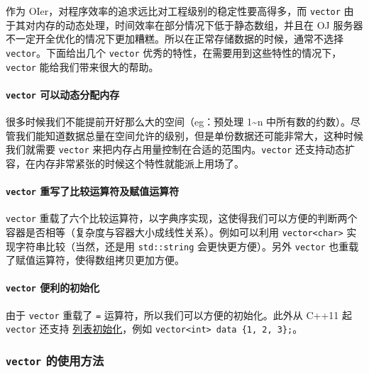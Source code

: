 作为 OIer，对程序效率的追求远比对工程级别的稳定性要高得多，而 \texttt{vector} 由于其对内存的动态处理，时间效率在部分情况下低于静态数组，并且在 OJ 服务器不一定开全优化的情况下更加糟糕。所以在正常存储数据的时候，通常不选择 \texttt{vector}。下面给出几个 \texttt{vector} 优秀的特性，在需要用到这些特性的情况下，\texttt{vector} 能给我们带来很大的帮助。

\paragraph{\texorpdfstring{\texttt{vector} 可以动态分配内存}{vector 可以动态分配内存}}\label{vector-ux53efux4ee5ux52a8ux6001ux5206ux914dux5185ux5b58}

很多时候我们不能提前开好那么大的空间（eg：预处理 1\textasciitilde n 中所有数的约数）。尽管我们能知道数据总量在空间允许的级别，但是单份数据还可能非常大，这种时候我们就需要 \texttt{vector} 来把内存占用量控制在合适的范围内。\texttt{vector} 还支持动态扩容，在内存非常紧张的时候这个特性就能派上用场了。

\paragraph{\texorpdfstring{\texttt{vector} 重写了比较运算符及赋值运算符}{vector 重写了比较运算符及赋值运算符}}\label{vector-ux91cdux5199ux4e86ux6bd4ux8f83ux8fd0ux7b97ux7b26ux53caux8d4bux503cux8fd0ux7b97ux7b26}

\texttt{vector} 重载了六个比较运算符，以字典序实现，这使得我们可以方便的判断两个容器是否相等（复杂度与容器大小成线性关系）。例如可以利用 \texttt{vector\textless{}char\textgreater{}} 实现字符串比较（当然，还是用 \texttt{std::string} 会更快更方便）。另外 \texttt{vector} 也重载了赋值运算符，使得数组拷贝更加方便。

\paragraph{\texorpdfstring{\texttt{vector} 便利的初始化}{vector 便利的初始化}}\label{vector-ux4fbfux5229ux7684ux521dux59cbux5316}

由于 \texttt{vector} 重载了 \texttt{=} 运算符，所以我们可以方便的初始化。此外从 C++11 起 \texttt{vector} 还支持 \href{https://zh.cppreference.com/w/cpp/language/list_initialization}{列表初始化}，例如 \texttt{vector\textless{}int\textgreater{}\ data\ \{1,\ 2,\ 3\};}。

\subsubsection{\texorpdfstring{\texttt{vector} 的使用方法}{vector 的使用方法}}\label{vector-ux7684ux4f7fux7528ux65b9ux6cd5}

